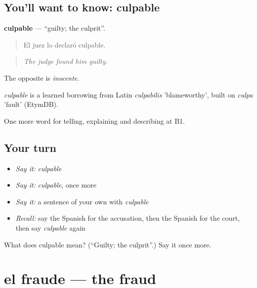 \subsection*{You'll want to know: culpable}
\textbf{culpable} — \textquotedblleft{}guilty; the culprit\textquotedblright{}.

\begin{quote}
El juez lo declaró culpable.
\end{quote}

\begin{quote}
\emph{The judge found him guilty.}
\end{quote}

The opposite is \emph{inocente}.

\begin{cousinweb}
\emph{culpable} is a learned borrowing from Latin \emph{culpabilis} 'blameworthy', built on \emph{culpa} 'fault' (EtymDB).
\end{cousinweb}

\begin{grammarlens}[title={What you've built}]
One more word for telling, explaining and describing at B1.
\end{grammarlens}

\subsection*{Your turn}
\begin{itemize}
\raggedright
  \item \emph{Say it:} \emph{culpable}
  \item \emph{Say it:} \emph{culpable}, once more
  \item \emph{Say it:} a sentence of your own with \emph{culpable}
  \item \emph{Recall:} say the Spanish for the accusation, then the Spanish for the court, then say \emph{culpable} again
\end{itemize}

\begin{tcolorbox}[breakable,colback=teal!4,colframe=teal!35!black,title={Before you move on}]
What does culpable mean? (\textquotedblleft{}Guilty; the culprit\textquotedblright{}.) Say it once more.
\end{tcolorbox}
\section[el fraude]{el fraude — the fraud}

